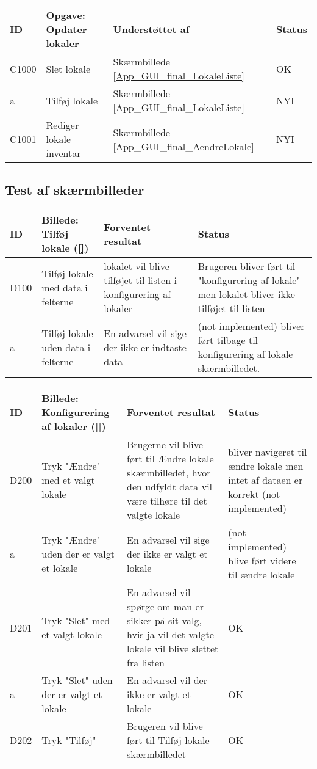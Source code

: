 \begin{longtable}{ |p{0.85cm}| p{7.1cm} | p{5.5cm} | p{2cm} | }
\hline
\textbf{ID} & \textbf{Opgave: Opdater lokaler} & \textbf{Understøttet af} & \textbf{Status}\\ 
\hline
C1000 & Slet lokale & Skærmbillede \ref{App_GUI_final_LokaleListe} & OK \\
\hline
a & Tilføj lokale & Skærmbillede \ref{App_GUI_final_LokaleListe} & NYI \\
\hline
C1001 & Rediger lokale inventar & Skærmbillede \ref{App_GUI_final_AendreLokale} & NYI \\
\hline
\end{longtable}
\pagebreak

\subsection{Test af skærmbilleder}
\label{App_Test_ListOfTest_ScreenTests}
\begin{longtable}{ |p{0.85cm}| p{7cm} | p{7.15cm} | p{1cm} | }
\hline
ID & Billede: Tilføj lokale (\ref{})  & Forventet resultat & Status\\ 
\hline
D100 &Tilføj lokale med data i felterne & lokalet vil blive tilføjet til listen i konfigurering af lokaler & Brugeren bliver ført til "konfigurering af lokale" men lokalet bliver ikke tilføjet til listen \\
\hline
a & Tilføj lokale uden data i felterne  & En advarsel vil sige der ikke er indtaste data &(not implemented) bliver ført tilbage til konfigurering af lokale skærmbilledet. \\
\hline
\end{longtable}

\begin{longtable}{ |p{0.85cm}| p{7cm} | p{7.15cm} | p{1cm} | }
\hline
ID & Billede: Konfigurering af lokaler (\ref{}) & Forventet resultat & Status\\ 
\hline
D200 & Tryk "Ændre" med et valgt lokale & Brugerne vil blive ført til Ændre lokale skærmbilledet, hvor den udfyldt data vil være tilhøre til det valgte lokale & bliver navigeret til ændre lokale men intet af dataen er korrekt (not implemented) \\
\hline
a & Tryk "Ændre" uden der er valgt et lokale & En advarsel vil sige der ikke er valgt et lokale & (not implemented) blive ført videre til ændre lokale \\
\hline
D201 & Tryk "Slet" med et valgt lokale &En advarsel vil spørge om man er sikker på sit valg, hvis ja vil det valgte lokale vil blive slettet fra listen & OK \\
\hline
a & Tryk "Slet" uden der er valgt et lokale & En advarsel vil der ikke er valgt et lokale & OK \\
\hline
D202 & Tryk "Tilføj" & Brugeren vil blive ført til Tilføj lokale skærmbilledet & OK\\
\hline
\end{longtable}


